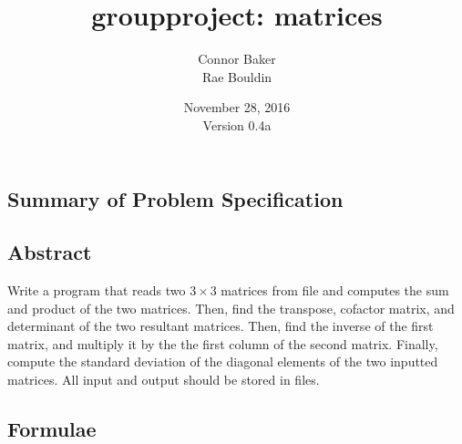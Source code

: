 \documentclass[12pt]{article}
\begin{document}
\null
\nointerlineskip 
\vfill
\let \snewpage \newpage
\let \newpage \relax
    \title{groupproject: matrices}
    \author{Connor Baker\\Rae Bouldin}
    \date{November 28, 2016\\Version 0.4a}
\maketitle
\let \newpage \snewpage
\vfill
\thispagestyle{empty}



\newpage %



\makeatletter
{}
\makeatother
\tableofcontents

\clearpage
{}

\begin{center}
\section{Summary of Problem Specification}
\end{center}
\subsection{Abstract}
Write a program that reads two $3\times3$ matrices from file and computes the sum and product of the two matrices. Then, find the transpose, cofactor matrix, and determinant of the two resultant matrices. Then, find the inverse of the first matrix, and multiply it by the the first column of the second matrix. Finally, compute the standard deviation of the diagonal elements of the two inputted matrices.
All input and output should be stored in files.



\newpage %



\begin{center}
\section{Formulae}
\end{center}
\end{document}
